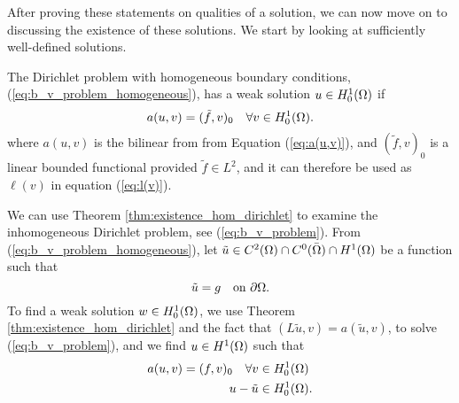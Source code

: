 After proving these statements on qualities of a solution, we can now move 
on to discussing the existence of these solutions. We start by looking at 
sufficiently well-defined solutions. 
\begin{defn}{\quad}
    The Dirichlet problem with homogeneous boundary conditions,
     (\ref{eq:b_v_problem_homogeneous}), has a weak solution $u\in H_0^1(\Omega)$
     if 
     \begin{equation*}
        a(u,v) = (\tilde{f},v)_0 \quad \forall v \in H_0^1(\Omega).
     \end{equation*}
     where $a(u,v)$ is the bilinear from from Equation (\ref{eq:a(u,v)}), 
     and $(\tilde{f},v)_0$ is a linear bounded functional provided $\tilde{f}\in L^2$, and it can therefore be used as $\ell(v)$ in equation (\ref{eq:l(v)}).
\end{defn}





We can use Theorem \ref{thm:existence_hom_dirichlet} to examine the inhomogeneous Dirichlet problem, 
see (\ref{eq:b_v_problem}). From (\ref{eq:b_v_problem_homogeneous}), let 
$\tilde{u} \in C^2(\Omega)\cap C^0(\bar{\Omega}) \cap H^1(\Omega)$ be a function such that 
\begin{equation*}
   \tilde{u} = g \quad \text{on } \partial \Omega.
\end{equation*}
To find a weak solution $w \in H_0^1(\Omega)$, we use Theorem \ref{thm:existence_hom_dirichlet} and the 
fact that $(L\tilde{u},v) = a(\tilde{u},v)$, to solve (\ref{eq:b_v_problem}), and
we find $u \in H^1(\Omega)$ such that 
\begin{align*}
   a(u,v) = (f,v)_0 \quad \forall v &\in H_0^1(\Omega) \\
   u-\tilde{u} & \in H_0^1(\Omega).
\end{align*}
